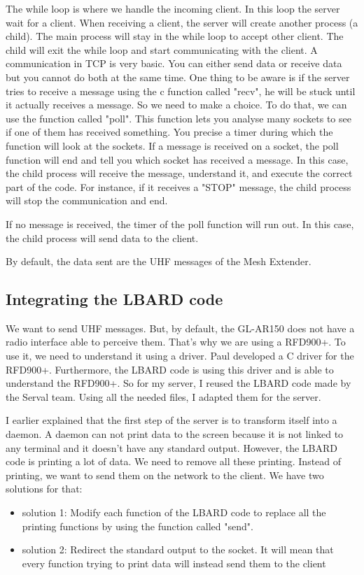 The while loop is where we handle the incoming client. In this loop the server wait for a client.
When receiving a client, the server will create another process (a child).
The main process will stay in the while loop to accept other client.
The child will exit the while loop and start communicating with the client. A communication in TCP is very basic.
You can either send data or receive data but you cannot do both at the same time. One thing to be aware is if the server tries to receive a message using the c function called "recv", he will be stuck until it actually receives a message.
So we need to make a choice. To do that, we can use the function called "poll". This function lets you analyse many sockets to see if one of them has received something. You precise a timer during which the function will look at the sockets. If a message is received on a socket, the poll function will end and tell you which socket has received a message. In this case, the child process will receive the message, understand it, and execute the correct part of the code. For instance, if it receives a "STOP" message, the child process will stop the communication and end.

If no message is received, the timer of the poll function will run out. In this case, the child process will send data to the client.

By default, the data sent are the UHF messages of the Mesh Extender.



\subsection{Integrating the LBARD code}

We want to send UHF messages. But, by default, the GL-AR150 does not have a radio interface able to perceive them. That's why we are using a RFD900+. To use it, we need to understand it using a driver. Paul developed a C driver for the RFD900+. Furthermore, the LBARD code is using this driver and is able to understand the RFD900+. So for my server, I reused the LBARD code made by the Serval team. Using all the needed files, I adapted them for the server.

I earlier explained that the first step of the server is to transform itself into a daemon. A daemon can not print data to the screen because it is not linked to any terminal and it doesn't have any standard output. However, the LBARD code is printing a lot of data. We need to remove all these printing. Instead of printing, we want to send them on the network to the client.
We have two solutions for that:
\begin{itemize}
	\item solution 1: Modify each function of the LBARD code to replace all the printing functions by using the function called "send". 
	\item solution 2: Redirect the standard output to the socket. It will mean that every function trying to print data will instead send them to the client  
\end{itemize}

